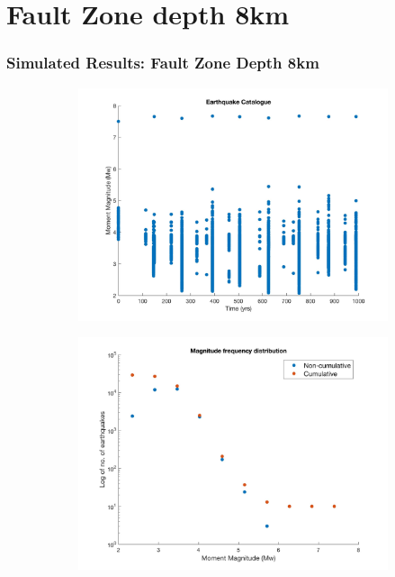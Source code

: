 \documentclass{beamer}
\begin{document}
\section{Fault Zone depth 8km}
\begin{frame}
    \frametitle{Simulated Results: Fault Zone Depth 8km}
    \begin{figure}
        \begin{subfigure}[b]{0.5\textwidth}
            \includegraphics[width=\textwidth]{images/result8km/catalogue} 
        \end{subfigure}%
        \begin{subfigure}[b]{0.5\textwidth}
            \includegraphics[width=\textwidth]{images/result8km/mfd}
        \end{subfigure}%
    \end{figure}
\end{frame}
\end{document}
